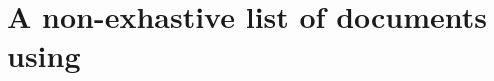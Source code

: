 \chapter[A non-exhastive list of documents using \sisyphe{}]{A non-exhastive list of documents using \sisyphe{}}









